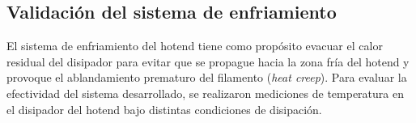 \subsection{Validación del sistema de enfriamiento}
\label{sec:validacion_enfriamiento}

El sistema de enfriamiento del hotend tiene como propósito evacuar el calor residual del disipador para evitar que se propague hacia la zona fría del hotend y provoque el ablandamiento prematuro del filamento (\textit{heat creep}). Para evaluar la efectividad del sistema desarrollado, se realizaron mediciones de temperatura en el disipador del hotend bajo distintas condiciones de disipación.

